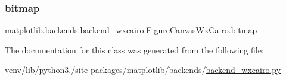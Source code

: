 \subsubsection{\texorpdfstring{bitmap}{bitmap}}
{\footnotesize\ttfamily matplotlib.\+backends.\+backend\+\_\+wxcairo.\+Figure\+Canvas\+Wx\+Cairo.\+bitmap}



The documentation for this class was generated from the following file\+:\begin{DoxyCompactItemize}
\item 
venv/lib/python3./site-\/packages/matplotlib/backends/\hyperlink{backend__wxcairo_8py}{backend\+\_\+wxcairo.\+py}\end{DoxyCompactItemize}
